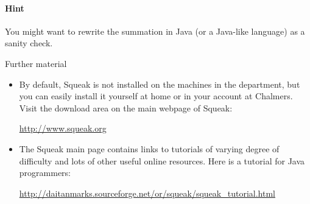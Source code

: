 \documentclass{article}
\begin{document}
\paragraph{Hint}
You might want to rewrite the summation in Java (or a Java-like language)
as a sanity check.

\noindent Further material
\begin{itemize}
\item By default, Squeak is not installed on the machines in the department,
but you can easily install it yourself at home or in your account at
Chalmers. Visit the download area on the main webpage of Squeak:

\url{http://www.squeak.org}

\item The Squeak main page contains links to tutorials of varying degree
of difficulty and lots of other useful online resources. Here is a 
tutorial for Java programmers:

\url{http://daitanmarks.sourceforge.net/or/squeak/squeak\_tutorial.html}

\end{itemize}
\end{document}
